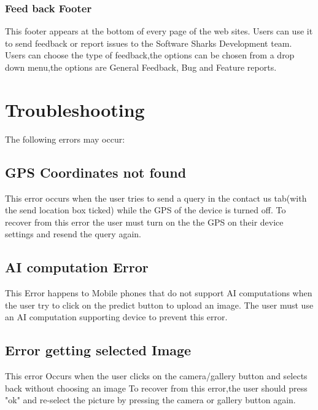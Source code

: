 \documentclass[a4paper, 12pt]{article}
\begin{document}
\subsubsection{Feed back Footer}
This footer appears at the bottom of every page of the web sites. Users can use it to send feedback or report issues to the Software Sharks Development team. Users can choose the type of feedback,the options can be chosen from a drop down menu,the options are General Feedback, Bug and Feature reports.






\pagebreak

\section{Troubleshooting}
The following errors may occur:
\subsection{GPS Coordinates not found}
This error occurs when the user tries to send a query in the contact us tab(with the send location box ticked)  while the GPS of the device is turned off.
\newline
To recover from this error the user must turn on the the GPS on their device settings and resend the query again.
\subsection{AI computation Error}
This Error happens to Mobile phones that do not support AI computations when the user try to click on the predict button to upload an image.
The user must use an AI computation supporting device to prevent this error.

\subsection{Error getting selected Image}
This error Occurs when the user clicks on the camera/gallery button and selects back without choosing an image 
\newline
To recover from this error,the user should press "ok" and re-select the picture by pressing the camera or gallery  button again.
\end{document}
